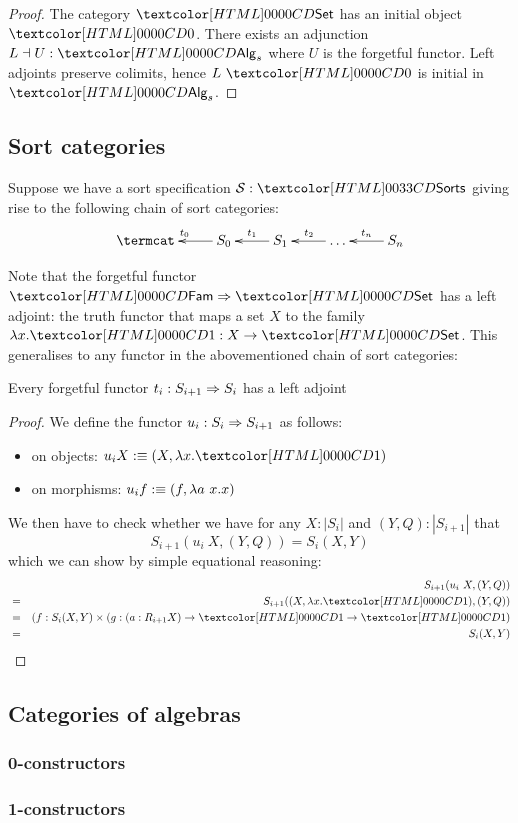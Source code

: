 \begin{proof}
  The category $\Set$ has an initial object $\initty$. There exists an
  adjunction $L \dashv U : \Alg_s$ where $U$ is the
  forgetful functor. Left adjoints preserve colimits, hence
  $L\ \initty$ is initial in $\Alg_s$.
\end{proof}

\subsection{Sort categories}

Suppose we have a sort specification $\Ss : \sortsty$ giving rise to
the following chain of sort categories:
$$
\xymatrix{
\termcat &S_0 \ar[l]_{t_0} &S_1 \ar[l]_{t_1} &\hdots \ar[l]_{t_2} &S_n \ar[l]_{t_n}
}
$$

Note that the forgetful functor $\Func{\Fam}{\Set}$ has a left
adjoint: the truth functor that maps a set $X$ to the family
$\lambda x . \unitty : X \to \Set$. This generalises to any functor in
the abovementioned chain of sort categories:

\begin{proposition}
Every forgetful functor $t_i : S_{i+1} \Rightarrow S_i$ has a left adjoint
\end{proposition}

\begin{proof}
  We define the functor $u_i : S_i \Rightarrow S_{i+1}$ as follows:
  \begin{itemize}
  \item on objects: $u_i X \ddefeq (X , \lambda x . \unitty)$
  \item on morphisms: $u_i f :\equiv (f , \lambda a\ x . x)$
  \end{itemize}
  We then have to check whether we have for any $X : | S_i |$ and
  $(Y,Q) : | S_{i+1} |$ that
  $$
  S_{i+1}(u_i\ X , (Y,Q)) = S_i(X,Y)
  $$
  which we can show by simple equational reasoning:
  \begin{align*}
      &&S_{i+1}(u_i\ X , (Y,Q)) \\
    &=& S_{i+1}((X,\lambda x . \unitty), (Y,Q)) \\
    &=& (f : S_i(X,Y) \times (g : (a : R_{i+1} X) \to \unitty \to \unitty) \\
    &=& S_i(X,Y)
  \end{align*}

\end{proof}

\subsection{Categories of algebras}

\subsubsection{0-constructors}

\subsubsection{1-constructors}
